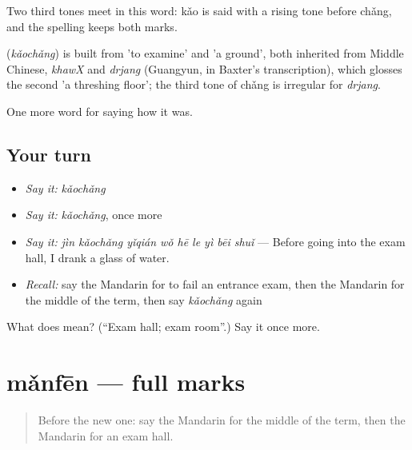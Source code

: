 Two third tones meet in this word: kǎo is said with a rising tone before chǎng, and the spelling keeps both marks.

\begin{cousinweb}
\textbf{} (\emph{kǎochǎng}) is built from  'to examine' and  'a ground', both inherited from Middle Chinese, \emph{khawX} and \emph{drjang} (Guangyun, in Baxter's transcription), which glosses the second 'a threshing floor'; the third tone of chǎng is irregular for \emph{drjang}.
\end{cousinweb}

\begin{grammarlens}[title={What you've built}]
One more word for saying how it was.
\end{grammarlens}

\subsection*{Your turn}
\begin{itemize}
\raggedright
  \item \emph{Say it:} \emph{kǎochǎng}
  \item \emph{Say it:} \emph{kǎochǎng}, once more
  \item \emph{Say it:} \emph{jìn kǎochǎng yǐqián wǒ hē le yì bēi shuǐ} — Before going into the exam hall, I drank a glass of water.
  \item \emph{Recall:} say the Mandarin for to fail an entrance exam, then the Mandarin for the middle of the term, then say \emph{kǎochǎng} again
\end{itemize}

\begin{tcolorbox}[breakable,colback=teal!4,colframe=teal!35!black,title={Before you move on}]
What does  mean? (\textquotedblleft{}Exam hall; exam room\textquotedblright{}.) Say it once more.
\end{tcolorbox}
\section[mǎnfēn]{mǎnfēn — full marks}

\label{lesson:ZH-C495-manfen}



\begin{quote}
Before the new one: say the Mandarin for the middle of the term, then the Mandarin for an exam hall.
\end{quote}

